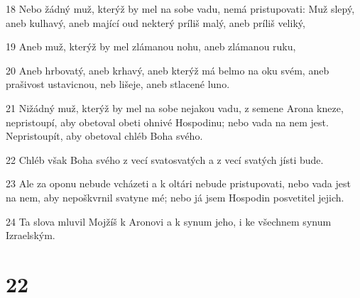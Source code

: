 \par 18 Nebo žádný muž, kterýž by mel na sobe vadu, nemá pristupovati: Muž slepý, aneb kulhavý, aneb mající oud nekterý príliš malý, aneb príliš veliký,
\par 19 Aneb muž, kterýž by mel zlámanou nohu, aneb zlámanou ruku,
\par 20 Aneb hrbovatý, aneb krhavý, aneb kterýž má belmo na oku svém, aneb prašivost ustavicnou, neb lišeje, aneb stlacené luno.
\par 21 Nižádný muž, kterýž by mel na sobe nejakou vadu, z semene Arona kneze, nepristoupí, aby obetoval obeti ohnivé Hospodinu; nebo vada na nem jest. Nepristoupít, aby obetoval chléb Boha svého.
\par 22 Chléb však Boha svého z vecí svatosvatých a z vecí svatých jísti bude.
\par 23 Ale za oponu nebude vcházeti a k oltári nebude pristupovati, nebo vada jest na nem, aby nepoškvrnil svatyne mé; nebo já jsem Hospodin posvetitel jejich.
\par 24 Ta slova mluvil Mojžíš k Aronovi a k synum jeho, i ke všechnem synum Izraelským.

\chapter{22}

